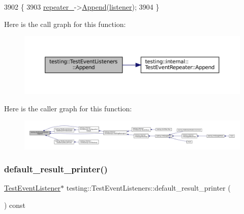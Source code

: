 \begin{DoxyCode}
3902                                                            \{
3903   \hyperlink{classtesting_1_1TestEventListeners_a625d58b951893e80cde12862aece6fd8}{repeater\_}->\hyperlink{classtesting_1_1internal_1_1TestEventRepeater_ad154ce021881721a5c46994316b14cb1}{Append}(\hyperlink{namespaceinteractive__marker_a0e579ab555212bb5e2c9f8a675b7618a}{listener});
3904 \}
\end{DoxyCode}
Here is the call graph for this function\+:
\nopagebreak
\begin{figure}[H]
\begin{center}
\leavevmode
\includegraphics[width=350pt]{classtesting_1_1TestEventListeners_a1207dce74d64c1c39ffa6105560536a0_cgraph}
\end{center}
\end{figure}
Here is the caller graph for this function\+:
\nopagebreak
\begin{figure}[H]
\begin{center}
\leavevmode
\includegraphics[width=350pt]{classtesting_1_1TestEventListeners_a1207dce74d64c1c39ffa6105560536a0_icgraph}
\end{center}
\end{figure}
\mbox{\label{classtesting_1_1TestEventListeners_a6293443acb5af942eeec638b6aa6dcf2}} 
\subsubsection{\texorpdfstring{default\+\_\+result\+\_\+printer()}{default\_result\_printer()}}
{\footnotesize\ttfamily \hyperlink{classtesting_1_1TestEventListener}{Test\+Event\+Listener}$\ast$ testing\+::\+Test\+Event\+Listeners\+::default\+\_\+result\+\_\+printer (\begin{DoxyParamCaption}{ }\end{DoxyParamCaption}) const\hspace{0.3cm}{\ttfamily [inline]}}



